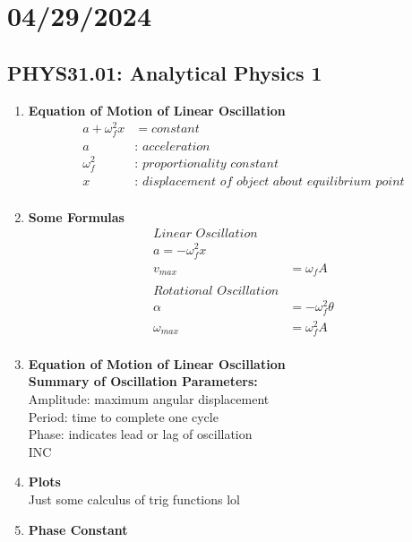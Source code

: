 \documentclass{article}
\begin{document}
\section*{04/29/2024}
\subsection*{PHYS31.01: Analytical Physics 1}
\begin{enumerate}
    \item \textbf{Equation of Motion of Linear Oscillation} \\
    \begin{align*}
        a+\omega_f^2x&=constant \\
        a&:\textit{ acceleration} \\
        \omega_f^2&:\textit{ proportionality constant} \\
        x&:\textit{ displacement of object about equilibrium point} \\
    \end{align*}
    \item \textbf{Some Formulas} \\
    \begin{align*}
        \textit{Linear Oscillation} \\
        a=-\omega_f^2x \\
        v_{max}&=\omega_fA \\
        \\
        \textit{Rotational Oscillation} \\
        \alpha&=-\omega_f^2\theta \\
        \omega_{max}&=\omega_f^2A \\
    \end{align*}
    \item \textbf{Equation of Motion of Linear Oscillation} \\
    \textbf{Summary of Oscillation Parameters:} \\
    Amplitude: maximum angular displacement \\
    Period: time to complete one cycle \\
    Phase: indicates lead or lag of oscillation \\
    INC \\
    \item \textbf{Plots} \\
    Just some calculus of trig functions lol \\
    \item \textbf{Phase Constant} \\

\end{enumerate}
\end{document}
